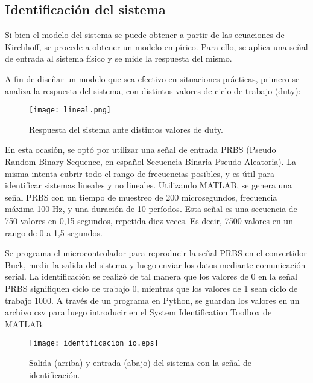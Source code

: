 \vspace{-0.5cm}
\subsection{\textbf{Identificación del sistema}}
\vspace{-0.5cm}
Si bien el modelo del sistema se puede obtener a partir de las ecuaciones de Kirchhoff, se procede
a obtener un modelo empírico. Para ello, se aplica una señal de entrada al sistema físico y se
mide la respuesta del mismo.

A fin de diseñar un modelo que sea efectivo en situaciones prácticas, primero se analiza la respuesta
del sistema, con distintos valores de ciclo de trabajo (duty):

\begin{figure}[H]
    \centering
    \texttt{[image: lineal.png]}
    \vspace{-0.25cm}
    \caption{Respuesta del sistema ante distintos valores de duty.}
    \label{fig:lineal}
\end{figure}
\vspace{-0.5cm}

En esta ocasión, se optó por utilizar una señal de entrada PRBS
(Pseudo Random Binary Sequence, en español Secuencia Binaria Pseudo Aleatoria). La misma intenta
cubrir todo el rango de frecuencias posibles, y es útil para identificar sistemas lineales y no lineales.
Utilizando MATLAB, se genera una señal PRBS con un tiempo de muestreo de 200 microsegundos, frecuencia máxima
100 Hz, y una duración de 10 períodos. Esta señal es una secuencia de 750 valores en 0,15 segundos, repetida diez veces.
Es decir, 7500 valores en un rango de 0 a 1,5 segundos.

Se programa el microcontrolador para reproducir la señal PRBS en el convertidor Buck, medir la salida
del sistema y luego enviar los datos mediante comunicación serial. La identificación se realizó de tal manera 
que los valores de 0 en la señal PRBS signifiquen ciclo de trabajo 0, mientras que los valores de 1 sean ciclo
de trabajo 1000. A través de un programa en Python, se guardan los valores en un archivo csv para luego introducir en el
System Identification Toolbox de MATLAB:


\begin{figure}[H]
    \centering
    \texttt{[image: identificacion\_io.eps]}
    \vspace{-0.25cm}
    \caption{Salida (arriba) y entrada (abajo) del sistema con la señal de identificación.}
    \label{fig:identificacion_io}
\end{figure}
\vspace{-0.5cm}

